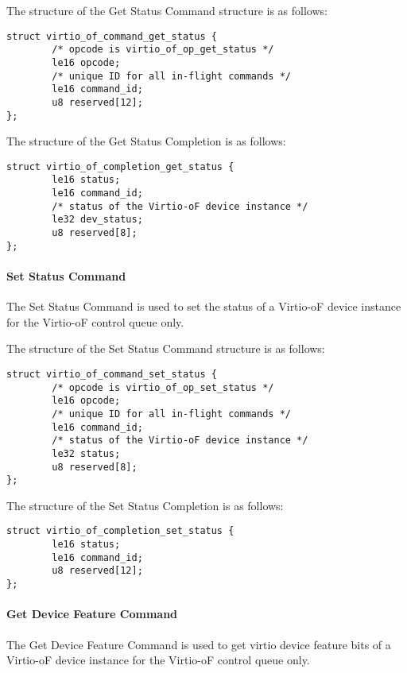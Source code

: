 The structure of the Get Status Command structure is as follows:
\begin{lstlisting}
struct virtio_of_command_get_status {
        /* opcode is virtio_of_op_get_status */
        le16 opcode;
        /* unique ID for all in-flight commands */
        le16 command_id;
        u8 reserved[12];
};
\end{lstlisting}

The structure of the Get Status Completion is as follows:
\begin{lstlisting}
struct virtio_of_completion_get_status {
        le16 status;
        le16 command_id;
        /* status of the Virtio-oF device instance */
        le32 dev_status;
        u8 reserved[8];
};
\end{lstlisting}

\paragraph{Set Status Command}\label{sec:Virtio Transport Options / Virtio Over Fabrics / Commands Definition / Opcodes / Set Status Command}
The Set Status Command is used to set the status of a Virtio-oF device instance for the Virtio-oF control queue only.

The structure of the Set Status Command structure is as follows:
\begin{lstlisting}
struct virtio_of_command_set_status {
        /* opcode is virtio_of_op_set_status */
        le16 opcode;
        /* unique ID for all in-flight commands */
        le16 command_id;
        /* status of the Virtio-oF device instance */
        le32 status;
        u8 reserved[8];
};
\end{lstlisting}

The structure of the Set Status Completion is as follows:
\begin{lstlisting}
struct virtio_of_completion_set_status {
        le16 status;
        le16 command_id;
        u8 reserved[12];
};
\end{lstlisting}

\paragraph{Get Device Feature Command}\label{sec:Virtio Transport Options / Virtio Over Fabrics / Commands Definition / Opcodes / Get Device Feature Command}
The Get Device Feature Command is used to get virtio device feature bits of a Virtio-oF device instance for the Virtio-oF control queue only.

